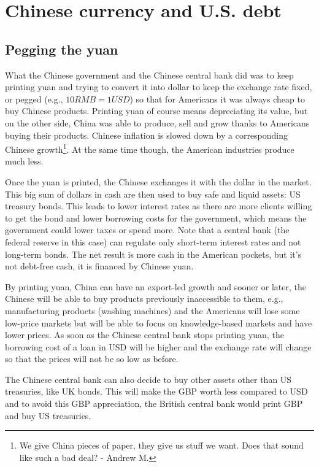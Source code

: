 \section{Chinese currency and U.S. debt}

\subsection{Pegging the yuan}
What the Chinese government and the Chinese central bank did was to keep printing yuan and trying to convert it into dollar to keep the exchange rate fixed, or pegged (e.g., $10 RMB = 1 USD$) so that for Americans it was always cheap to buy Chinese products. Printing yuan of course means depreciating its value, but on the other side, China was able to produce, sell and grow thanks to Americans buying their products. Chinese inflation is slowed down by a corresponding Chinese growth\footnote{We give China pieces of paper, they give us stuff we want. Does that sound like such a bad deal? - Andrew M.}. At the same time though, the American industries produce much less. 

Once the yuan is printed, the Chinese exchanges it with the dollar in the market. This big sum of dollars in cash are then used to buy safe and liquid assets: US treasury bonds. This leads to lower interest rates as there are more clients willing to get the bond and lower borrowing costs for the government, which means the government could lower taxes or spend more. Note that a central bank (the federal reserve in this case) can regulate only short-term interest rates and not long-term bonds. The net result is more cash in the American pockets, but it's not debt-free cash, it is financed by Chinese yuan.

By printing yuan, China can have an export-led growth and sooner or later, the Chinese will be able to buy products previously inaccessible to them, e.g., manufacturing products (washing machines) and the Americans will lose some low-price markets but will be able to focus on knowledge-based markets and have lower prices. As soon as the Chinese central bank stops printing yuan, the borrowing cost of a loan in USD will be higher and the exchange rate will change so that the prices will not be so low as before.

The Chinese central bank can also decide to buy other assets other than US treasuries, like UK bonds. This will make the GBP worth less compared to USD and to avoid this GBP appreciation, the British central bank would print GBP and buy US treasuries.

